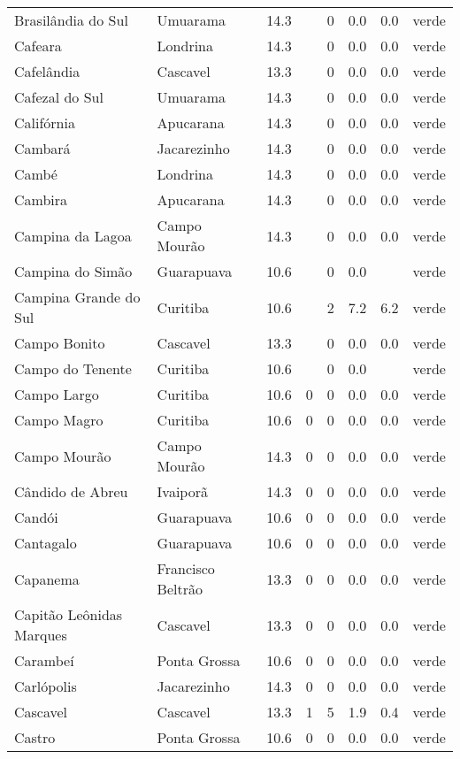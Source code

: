 \begin{longtable}{l|lllllll}
  Brasilândia do Sul & Umuarama & 14.3 &  & 0 & 0.0 & 0.0 & verde \\ 
  Cafeara & Londrina & 14.3 &  & 0 & 0.0 & 0.0 & verde \\ 
  Cafelândia & Cascavel & 13.3 &  & 0 & 0.0 & 0.0 & verde \\ 
  Cafezal do Sul & Umuarama & 14.3 &  & 0 & 0.0 & 0.0 & verde \\ 
  Califórnia & Apucarana & 14.3 &  & 0 & 0.0 & 0.0 & verde \\ 
  Cambará & Jacarezinho & 14.3 &  & 0 & 0.0 & 0.0 & verde \\ 
  Cambé & Londrina & 14.3 &  & 0 & 0.0 & 0.0 & verde \\ 
  Cambira & Apucarana & 14.3 &  & 0 & 0.0 & 0.0 & verde \\ 
  Campina da Lagoa & Campo Mourão & 14.3 &  & 0 & 0.0 & 0.0 & verde \\ 
  Campina do Simão & Guarapuava & 10.6 &  & 0 & 0.0 &  & verde \\ 
  Campina Grande do Sul & Curitiba & 10.6 &  & 2 & 7.2 & 6.2 & verde \\ 
  Campo Bonito & Cascavel & 13.3 &  & 0 & 0.0 & 0.0 & verde \\ 
  Campo do Tenente & Curitiba & 10.6 &  & 0 & 0.0 &  & verde \\ 
  Campo Largo & Curitiba & 10.6 & 0 & 0 & 0.0 & 0.0 & verde \\ 
  Campo Magro & Curitiba & 10.6 & 0 & 0 & 0.0 & 0.0 & verde \\ 
  Campo Mourão & Campo Mourão & 14.3 & 0 & 0 & 0.0 & 0.0 & verde \\ 
  Cândido de Abreu & Ivaiporã & 14.3 & 0 & 0 & 0.0 & 0.0 & verde \\ 
  Candói & Guarapuava & 10.6 & 0 & 0 & 0.0 & 0.0 & verde \\ 
  Cantagalo & Guarapuava & 10.6 & 0 & 0 & 0.0 & 0.0 & verde \\ 
  Capanema & Francisco Beltrão & 13.3 & 0 & 0 & 0.0 & 0.0 & verde \\ 
  Capitão Leônidas Marques & Cascavel & 13.3 & 0 & 0 & 0.0 & 0.0 & verde \\ 
  Carambeí & Ponta Grossa & 10.6 & 0 & 0 & 0.0 & 0.0 & verde \\ 
  Carlópolis & Jacarezinho & 14.3 & 0 & 0 & 0.0 & 0.0 & verde \\ 
  Cascavel & Cascavel & 13.3 & 1 & 5 & 1.9 & 0.4 & verde \\ 
  Castro & Ponta Grossa & 10.6 & 0 & 0 & 0.0 & 0.0 & verde \\ 

\end{longtable}
